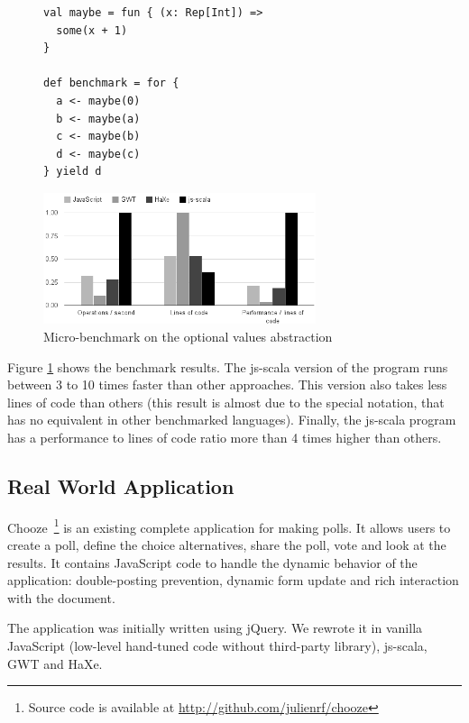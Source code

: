\documentclass[preprint]{sigplanconf}
\begin{document}
\begin{figure}
\begin{lstlisting}[label=lst:option-benchmark,caption=Micro-benchmark code for the optional values
abstraction]
val maybe = fun { (x: Rep[Int]) =>
  some(x + 1)
}

def benchmark = for {
  a <- maybe(0)
  b <- maybe(a)
  c <- maybe(b)
  d <- maybe(c)
} yield d
\end{lstlisting}
\end{figure}


\begin{figure}
\centering
\includegraphics[width=8cm]{microbenchmark.png}
\caption{Micro-benchmark on the optional values abstraction}
\label{micro-benchmark}
\end{figure}

Figure \ref{micro-benchmark} shows the benchmark results. The js-scala version of the program runs
between 3 to 10 times faster than other approaches. This version also takes less lines of code than
others (this result is almost due to the special  notation, that has no equivalent in
other benchmarked languages). Finally, the js-scala program has a performance to lines of code ratio
more than 4 times higher than others.

\subsection{Real World Application}

Chooze~\footnote{Source code is available at
\href{http://github.com/julienrf/chooze}{http://github.com/julienrf/chooze}} is an existing
complete application for making polls. It allows users to create a poll, define the choice
alternatives, share the poll, vote and look at the results. It contains JavaScript code to handle
the dynamic behavior of the application: double-posting prevention, dynamic form update and rich
interaction with the document.

The application was initially written using jQuery. We rewrote it in vanilla JavaScript (low-level
hand-tuned code without third-party library), js-scala, GWT and HaXe.
\end{document}
